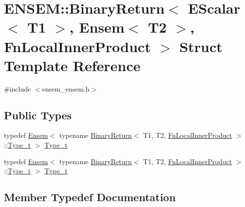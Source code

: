 \hypertarget{structENSEM_1_1BinaryReturn_3_01EScalar_3_01T1_01_4_00_01Ensem_3_01T2_01_4_00_01FnLocalInnerProduct_01_4}{}\section{E\+N\+S\+EM\+:\+:Binary\+Return$<$ E\+Scalar$<$ T1 $>$, Ensem$<$ T2 $>$, Fn\+Local\+Inner\+Product $>$ Struct Template Reference}
\label{structENSEM_1_1BinaryReturn_3_01EScalar_3_01T1_01_4_00_01Ensem_3_01T2_01_4_00_01FnLocalInnerProduct_01_4}


{\ttfamily \#include $<$ensem\+\_\+ensem.\+h$>$}

\subsection*{Public Types}
\begin{DoxyCompactItemize}
\item 
typedef \mbox{\hyperlink{classENSEM_1_1Ensem}{Ensem}}$<$ typename \mbox{\hyperlink{structENSEM_1_1BinaryReturn}{Binary\+Return}}$<$ T1, T2, \mbox{\hyperlink{structENSEM_1_1FnLocalInnerProduct}{Fn\+Local\+Inner\+Product}} $>$\+::\mbox{\hyperlink{structENSEM_1_1BinaryReturn_3_01EScalar_3_01T1_01_4_00_01Ensem_3_01T2_01_4_00_01FnLocalInnerProduct_01_4_ae42ca536bfa1a7ec2f82fdf57061f99a}{Type\+\_\+t}} $>$ \mbox{\hyperlink{structENSEM_1_1BinaryReturn_3_01EScalar_3_01T1_01_4_00_01Ensem_3_01T2_01_4_00_01FnLocalInnerProduct_01_4_ae42ca536bfa1a7ec2f82fdf57061f99a}{Type\+\_\+t}}
\item 
typedef \mbox{\hyperlink{classENSEM_1_1Ensem}{Ensem}}$<$ typename \mbox{\hyperlink{structENSEM_1_1BinaryReturn}{Binary\+Return}}$<$ T1, T2, \mbox{\hyperlink{structENSEM_1_1FnLocalInnerProduct}{Fn\+Local\+Inner\+Product}} $>$\+::\mbox{\hyperlink{structENSEM_1_1BinaryReturn_3_01EScalar_3_01T1_01_4_00_01Ensem_3_01T2_01_4_00_01FnLocalInnerProduct_01_4_ae42ca536bfa1a7ec2f82fdf57061f99a}{Type\+\_\+t}} $>$ \mbox{\hyperlink{structENSEM_1_1BinaryReturn_3_01EScalar_3_01T1_01_4_00_01Ensem_3_01T2_01_4_00_01FnLocalInnerProduct_01_4_ae42ca536bfa1a7ec2f82fdf57061f99a}{Type\+\_\+t}}
\end{DoxyCompactItemize}


\subsection{Member Typedef Documentation}
\mbox{\label{structENSEM_1_1BinaryReturn_3_01EScalar_3_01T1_01_4_00_01Ensem_3_01T2_01_4_00_01FnLocalInnerProduct_01_4_ae42ca536bfa1a7ec2f82fdf57061f99a}} 
